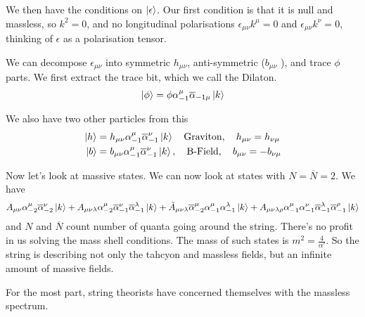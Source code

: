 \documentclass[11pt, oneside]{article}   	%
\theoremstyle{slanted}
\begin{document}
We then have the conditions on $ \ket{ \epsilon } $.
Our first condition is that it is null and massless, 
so $ k ^ 2  = 0$, and no longitudinal polarisations 
$ \epsilon _{ \mu \nu } k ^ \mu  = 0 $ and $ \epsilon _{ \mu \nu  } k ^ \nu  = 0 $, 
thinking of 
$ \epsilon $ as a polarisation tensor. 


We can decompose $ \epsilon _{ \mu \nu } $ into 
symmetric $ h _{ \mu \nu } $, anti-symmetric ($ b _{ \mu \nu }  $  ), 
and trace $ \phi $ parts. 
We first extract the trace bit, 
which we call the Dilaton. 
\[
 \ket{ \phi }  = \phi \alpha _{ -  1 } ^ \mu \overline{ \alpha } _{ - 1 \mu } \ket{ k }  
\]  

We also have two other particles from this 
\begin{align*}
	\ket{ h }  &=  h _{ \mu \nu  } \alpha _{ - 1 } ^ \mu \overline{ \alpha }_{ - 1 } ^ \nu 
	\ket{ k } \quad \text{Graviton}, \quad h _{ \mu \nu }  = h _{ \nu \mu  } \\
	\ket{ b } &=  b _{ \mu \nu } \alpha _{ - 1 } ^ \mu \overline{ \alpha } _{ - 1 }^ \nu 
	\ket{ k }, \quad \text{B-Field}, \quad b _{ \mu \nu }  = - b _{ \nu \mu } \\
\end{align*}

Now let's look at massive states. 
We can now look at states with $ N = \overline{ N }  = 2 $. 
We have 
\[
 A _{ \mu \nu } \alpha _{ - 2 } ^ \mu \overline{ \alpha } _{ - 2 } ^ \nu \ket{ k } 
 + A_{ \mu \nu \lambda } \alpha _{ - 2 } ^ \mu \overline{ \alpha } _{ - 1 } ^ \nu 
 \overline{ \alpha } _{ -  1 } ^ \lambda \ket{ k } + 
 \tilde{ A }_{ \mu \nu \lambda } \overline{\alpha } _{ - 2 } ^ \mu \alpha _{ - 1 }^ \mu  \alpha _{ - 1}  
 ^ \lambda \ket{ k } + A _{ \mu \nu \lambda \rho } \alpha _{ - 1 } ^ \mu \alpha _{ -1 } ^ \nu 
 \overline{ \alpha  } _{ - 1 } ^ \lambda \overline{ \alpha } _{ -1 } ^ \rho \ket{ k } 
\] and $ N $ and $ \overline{ N  } $ count 
number of quanta going around the string. 
There's no profit 
in us solving the mass shell conditions. 
The mass of such states is $ m ^ 2  = \frac{4}{\alpha ' }  $. 
So the string is describing not only the tahcyon 
and massless fields, but an infinite amount of massive 
fields.

For the most part, string theorists 
have concerned themselves with the massless spectrum. 
\end{document}
